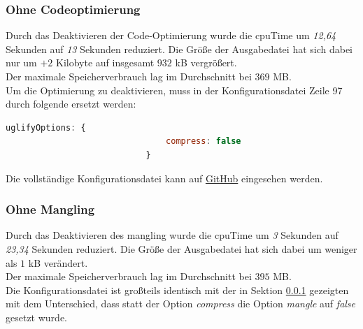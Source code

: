 \documentclass[11pt]{report}
\begin{document}
        		\subsubsection{Ohne Codeoptimierung}
        			\label{section:minification_noCompress}
	        		Durch das Deaktivieren der Code-Optimierung wurde die \Gls{cpuTime} um \emph{12,64} Sekunden auf \emph{13} Sekunden reduziert. Die Größe der Ausgabedatei hat sich dabei nur um $+2$ Kilobyte auf insgesamt $932$ kB vergrößert.\\
	        		Der maximale Speicherverbrauch lag im Durchschnitt bei $369$ MB.\\
		        	Um die Optimierung zu deaktivieren, muss in der Konfigurationsdatei Zeile 97 durch folgende ersetzt werden:\\
		        	\begin{center}
			        	\lstset{%
						    caption=Deaktivierung der Codeoptimierung,
							basicstyle=\footnotesize,
							xleftmargin=.2\textwidth,
							xrightmargin=.2\textwidth,
							numbers=none
						}
			        	\begin{lstlisting}[language=JavaScript]
							uglifyOptions: {
								compress: false
							}
			        	\end{lstlisting}
		        	\end{center}
		        	Die vollständige Konfigurationsdatei kann auf \href{https://github.com/TexNAK/WebBundlerOptimization/compare/master...nondestr_scopedCompilation#diff-1fb5683b1e7adbcee273b7f9f9a08a22}{GitHub} eingesehen werden.
		        	

        		\subsubsection{Ohne Mangling}
	        		Durch das Deaktivieren des \Gls{mangling} wurde die \Gls{cpuTime} um \emph{3} Sekunden auf \emph{23,34} Sekunden reduziert. Die Größe der Ausgabedatei hat sich dabei um weniger als $1$ kB verändert.\\
	        		Der maximale Speicherverbrauch lag im Durchschnitt bei $395$ MB.\\
        			Die Konfigurationsdatei ist großteils identisch mit der in Sektion \ref{section:minification_noCompress} gezeigten mit dem Unterschied, dass statt der Option \emph{compress} die Option \emph{mangle} auf \emph{false} gesetzt wurde.
        			
\end{document}
